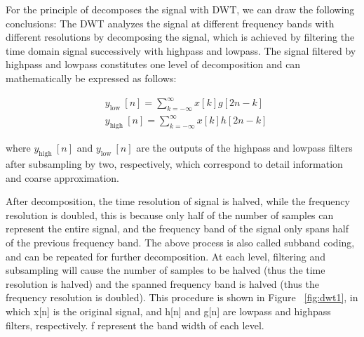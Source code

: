 For the principle of decomposes the signal with DWT, we can draw the following conclusions: The DWT analyzes the signal at different frequency bands with different resolutions by decomposing the signal, which is achieved by filtering the time domain signal successively with highpass and lowpass. The signal filtered by highpass and lowpass constitutes one level of decomposition and can
mathematically be expressed as follows:

\begin{equation}
\begin{aligned}
&y_{\text {low }}[n]=\sum_{k=-\infty}^{\infty} x[k] g[2 n-k] \\
&y_{\text {high }}[n]=\sum_{k=-\infty}^{\infty} x[k] h[2 n-k]
\end{aligned}
\end{equation}

where $y_{\text {high }}[n]$ and $y_{\text {low }}[n]$ are the outputs of the highpass and lowpass filters after subsampling by two, respectively, which correspond to detail information and coarse approximation.

After decomposition, the time resolution of signal is halved, while the frequency resolution is doubled, this is because only half of the number of samples can represent the entire signal, and the frequency band of the signal only spans half of the previous frequency band. The above process is also called subband coding, and can be repeated for further decomposition. At each level, filtering and subsampling will cause the number of samples to be halved (thus the time resolution is halved) and the spanned frequency band is halved (thus the frequency resolution is doubled). This procedure is shown in Figure ~\ref{fig:dwt1}, in which x[n] is the original signal, and h[n] and g[n]
are lowpass and highpass filters, respectively. f represent the band width of each level. 

